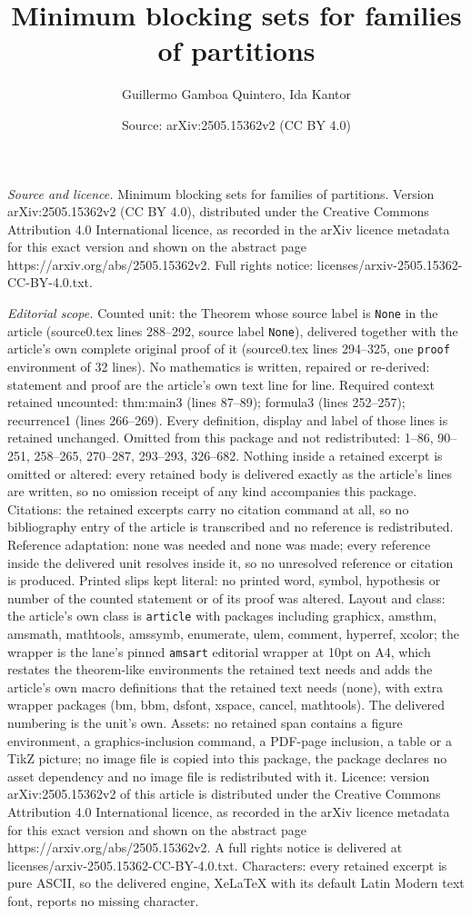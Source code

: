 \documentclass[10pt,a4paper]{amsart}
\title[Minimum blocking sets for families of partitions]{Minimum blocking sets for families of partitions}
\author{Guillermo Gamboa Quintero, Ida Kantor}
\date{Source: arXiv:2505.15362v2 (CC BY 4.0)}
\begin{document}
\maketitle

\noindent\emph{Source and licence.} Minimum blocking sets for families of partitions. Version arXiv:2505.15362v2 (CC BY 4.0), distributed under the Creative Commons Attribution 4.0 International licence, as recorded in the arXiv licence metadata for this exact version and shown on the abstract page https://arxiv.org/abs/2505.15362v2. Full rights notice: licenses/arxiv-2505.15362-CC-BY-4.0.txt.\par\smallskip

\noindent\textit{Editorial scope.} Counted unit: the Theorem whose source label is \texttt{None} in the article (source0.tex lines 288--292, source label \texttt{None}), delivered together with the article's own complete original proof of it (source0.tex lines 294--325, one \texttt{proof} environment of 32 lines). No mathematics is written, repaired or re-derived: statement and proof are the article's own text line for line. Required context retained uncounted: thm:main3 (lines 87--89); formula3 (lines 252--257); recurrence1 (lines 266--269). Every definition, display and label of those lines is retained unchanged. Omitted from this package and not redistributed: 1--86, 90--251, 258--265, 270--287, 293--293, 326--682. Nothing inside a retained excerpt is omitted or altered: every retained body is delivered exactly as the article's lines are written, so no omission receipt of any kind accompanies this package. Citations: the retained excerpts carry no citation command at all, so no bibliography entry of the article is transcribed and no reference is redistributed. Reference adaptation: none was needed and none was made; every reference inside the delivered unit resolves inside it, so no unresolved reference or citation is produced. Printed slips kept literal: no printed word, symbol, hypothesis or number of the counted statement or of its proof was altered. Layout and class: the article's own class is \texttt{article} with packages including graphicx, amsthm, amsmath, mathtools, amssymb, enumerate, ulem, comment, hyperref, xcolor; the wrapper is the lane's pinned \texttt{amsart} editorial wrapper at 10pt on A4, which restates the theorem-like environments the retained text needs and adds the article's own macro definitions that the retained text needs (none), with extra wrapper packages (bm, bbm, dsfont, xspace, cancel, mathtools). The delivered numbering is the unit's own. Assets: no retained span contains a figure environment, a graphics-inclusion command, a PDF-page inclusion, a table or a TikZ picture; no image file is copied into this package, the package declares no asset dependency and no image file is redistributed with it. Licence: version arXiv:2505.15362v2 of this article is distributed under the Creative Commons Attribution 4.0 International licence, as recorded in the arXiv licence metadata for this exact version and shown on the abstract page https://arxiv.org/abs/2505.15362v2. A full rights notice is delivered at licenses/arxiv-2505.15362-CC-BY-4.0.txt. Characters: every retained excerpt is pure ASCII, so the delivered engine, XeLaTeX with its default Latin Modern text font, reports no missing character.
\end{document}
